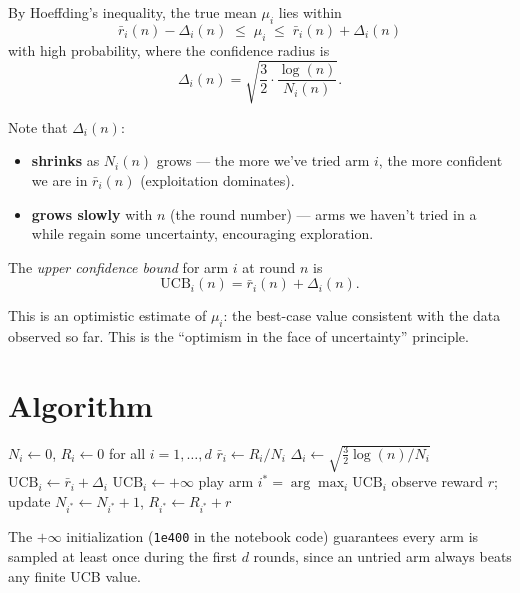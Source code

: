 \documentclass[11pt]{article}
\begin{document}
By Hoeffding's inequality, the true mean $\mu_i$ lies within
\[
  \bar{r}_i(n) - \Delta_i(n) \;\le\; \mu_i \;\le\; \bar{r}_i(n) + \Delta_i(n)
\]
with high probability, where the confidence radius is
\[
  \Delta_i(n) = \sqrt{\frac{3}{2} \cdot \frac{\log(n)}{N_i(n)}}.
\]

Note that $\Delta_i(n)$:
\begin{itemize}
  \item \textbf{shrinks} as $N_i(n)$ grows --- the more we've tried arm $i$,
        the more confident we are in $\bar{r}_i(n)$ (exploitation dominates).
  \item \textbf{grows slowly} with $n$ (the round number) --- arms we
        haven't tried in a while regain some uncertainty, encouraging
        exploration.
\end{itemize}

The \emph{upper confidence bound} for arm $i$ at round $n$ is
\[
  \text{UCB}_i(n) = \bar{r}_i(n) + \Delta_i(n).
\]

This is an optimistic estimate of $\mu_i$: the best-case value consistent
with the data observed so far. This is the ``optimism in the face of
uncertainty'' principle.

\section{Algorithm}

\begin{algorithm}[h]
\caption{Upper Confidence Bound}
\begin{algorithmic}[1]
\State $N_i \gets 0$, $R_i \gets 0$ for all $i = 1, \dots, d$
      \State $\bar{r}_i \gets R_i / N_i$
      \State $\Delta_i \gets \sqrt{\tfrac{3}{2}\log(n)/N_i}$
      \State $\text{UCB}_i \gets \bar{r}_i + \Delta_i$
    \Else
      \State $\text{UCB}_i \gets +\infty$ 
    \EndIf
  \EndFor
  \State play arm $i^\ast = \arg\max_i \text{UCB}_i$
  \State observe reward $r$; update $N_{i^\ast} \gets N_{i^\ast} + 1$,
         $R_{i^\ast} \gets R_{i^\ast} + r$
\EndFor
\end{algorithmic}
\end{algorithm}

The $+\infty$ initialization (\texttt{1e400} in the notebook code) guarantees
every arm is sampled at least once during the first $d$ rounds, since an
untried arm always beats any finite UCB value.
\end{document}
